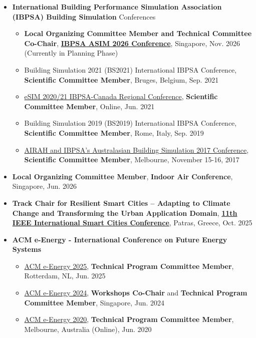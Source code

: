 \documentclass[10pt,a4paper]{article}
\begin{document}
\begin{small}
\begin{itemize}
\item
\textbf{International Building Performance Simulation Association (IBPSA) Building Simulation} Conferences
\begin{itemize}
\item
\textbf{Local Organizing Committee Member and Technical Committee Co-Chair}, \href{https://asim2026.sg}{\textbf{IBPSA ASIM 2026 Conference}}, Singapore, Nov. 2026 (Currently in Planning Phase)
\item Building Simulation 2021 (BS2021) International IBPSA Conference, \textbf{Scientific Committee Member}, Bruges, Belgium, Sep. 2021
\item \href{http://esim2020.sala.ubc.ca/}{eSIM 2020/21 IBPSA-Canada Regional Conference}, \textbf{Scientific Committee Member}, Online, Jun. 2021
\item Building Simulation 2019 (BS2019) International IBPSA Conference, \textbf{Scientific Committee Member}, Rome, Italy, Sep. 2019
\item \href{https://www.ibpsa-australasia.org/post/australasian-building-simulation-conference-2017}{AIRAH and IBPSA’s Australasian Building Simulation 2017 Conference}, \textbf{Scientific Committee Member}, Melbourne, November 15-16, 2017
\end{itemize}

\item
\textbf{Local Organizing Committee Member}, \textbf{Indoor Air Conference}, Singapore, Jun. 2026

\item 
\textbf{Track Chair for Resilient Smart Cities – Adapting to Climate Change and Transforming the Urban Application Domain},
\href{https://isc2-2025.org}{\textbf{11th IEEE International Smart Cities Conference}}, Patras, Greece, Oct. 2025

\item
\textbf{ACM e-Energy - International Conference on Future Energy Systems}
\begin{itemize}
\item \href{https://energy.acm.org/conferences/eenergy/2025/}{ACM e-Energy 2025}, \textbf{Technical Program Committee Member}, Rotterdam, NL, Jun. 2025
\item \href{https://energy.acm.org/conferences/eenergy/2024/}{ACM e-Energy 2024}, \textbf{Workshops Co-Chair} and \textbf{Technical Program Committee Member}, Singapore, Jun. 2024
\item \href{https://energy.acm.org/conferences/eenergy/2020/}{ACM e-Energy 2020}, \textbf{Technical Program Committee Member}, Melbourne, Australia (Online), Jun. 2020
\end{itemize}


\end{itemize}
\end{small}
\end{document}

